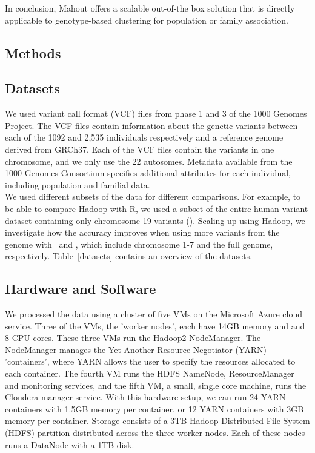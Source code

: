 \documentclass{bioinfo}
\begin{document}
In conclusion, Mahout offers a scalable out-of-the box solution that is directly applicable to genotype-based clustering for population or family association. 



\begin{methods}
\section{Methods}
\subsection*{Datasets}
We used variant call format (VCF) files from phase 1 and 3 of the 1000 Genomes Project.
The VCF files contain information about the genetic variants between each of the 1092 and 2,535 individuals respectively and a reference genome derived from GRCh37. 
Each of the VCF files contain the variants in one chromosome, and we only use the 22 autosomes.
Metadata available from the 1000 Genomes Consortium specifies additional attributes for each individual, including population and familial data.\\
We used different subsets of the data for different comparisons. For example, to be able to compare Hadoop with R, we used a subset of the entire human variant dataset containing only chromosome 19 variants (\NinteenPhaseone ).
Scaling up using Hadoop, we investigate how the accuracy improves when using more variants from the genome with \SevenPhaseone\ and \FullPhasethree, which include chromosome 1-7 and the full genome, respectively.
Table~\ref{datasets} contains an overview of the datasets.

\subsection*{Hardware and Software}
We processed the data using a cluster of five VMs on the Microsoft Azure cloud service. Three of the VMs, the 'worker nodes', each have 14GB memory and and 8 CPU cores. These three VMs run the Hadoop2 NodeManager. The NodeManager manages the Yet Another Resource Negotiator (YARN) 'containers', where YARN allows the user
to specify the resources allocated to each container.
The fourth VM runs the HDFS NameNode, ResourceManager and monitoring services, and the fifth VM, a small, single core machine, runs the Cloudera manager service.
With this hardware setup, we can run 24 YARN containers with 1.5GB memory per container, or 12 YARN containers with 3GB memory per container.
Storage consists of a 3TB Hadoop Distributed File System (HDFS) partition distributed across the three worker nodes. Each of these nodes runs a DataNode with a 1TB disk.


\end{methods}
\end{document}
